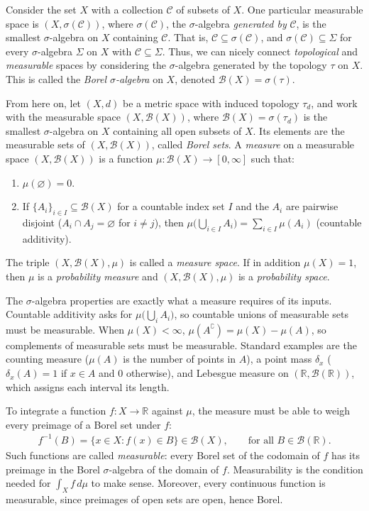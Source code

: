 \documentclass[12pt]{article}
\theoremstyle{remark}
\begin{document}
Consider the set $X$ with a collection $\mathcal{C}$ of subsets of $X$. One particular 
measurable space is $(X,\sigma(\mathcal{C}))$, where $\sigma(\mathcal{C})$, the $\sigma$-algebra 
\emph{generated by} $\mathcal{C}$, is the smallest $\sigma$-algebra on $X$ containing $\mathcal{C}$. 
That is, $\mathcal{C}\subseteq\sigma(\mathcal{C})$, and $\sigma(\mathcal{C})\subseteq\Sigma$ 
for every $\sigma$-algebra $\Sigma$ on $X$ with $\mathcal{C}\subseteq\Sigma$. Thus, we can 
nicely connect \emph{topological} and \emph{measurable} spaces by considering the 
$\sigma$-algebra generated by the topology $\tau$ on $X$. This is called the 
\emph{Borel $\sigma$-algebra} on $X$, denoted $\mathcal{B}(X)=\sigma(\tau)$.  

From here on, let $(X,d)$ be a metric space with induced topology $\tau_d$, and work with the 
measurable space $(X,\mathcal{B}(X))$, where $\mathcal{B}(X)=\sigma(\tau_d)$ is the smallest 
$\sigma$-algebra on $X$ containing all open subsets of $X$. Its elements are the measurable 
sets of $(X,\mathcal{B}(X))$, called \emph{Borel sets}. 
A \emph{measure} on a measurable space $(X,\mathcal{B}(X))$ is a function 
$\mu:\mathcal{B}(X)\to[0,\infty]$ such that:
\begin{enumerate}
    \item $\mu(\varnothing)=0$.
    \item If $\{A_i\}_{i\in I}\subseteq\mathcal{B}(X)$ for a countable index set $I$ and the $A_i$ are pairwise 
        disjoint ($A_i\cap A_j=\varnothing$ for $i\neq j$), then 
        $\mu\bigl(\bigcup_{i\in I}A_i\bigr)=\sum_{i\in I}\mu(A_i)$ (countable additivity).
\end{enumerate}
The triple $(X,\mathcal{B}(X),\mu)$ is called a \emph{measure space}. If in addition $\mu(X)=1$, then $\mu$ is 
a \emph{probability measure} and $(X,\mathcal{B}(X),\mu)$ is a \emph{probability space}.

The $\sigma$-algebra properties are exactly what a measure requires of its inputs. Countable additivity 
asks for $\mu\bigl(\bigcup_i A_i\bigr)$, so countable unions of measurable sets must be measurable. 
When $\mu(X)<\infty$, $\mu(A^\complement)=\mu(X)-\mu(A)$, so complements of measurable sets must be 
measurable. Standard examples are the counting measure ($\mu(A)$ is the number of points in $A$), 
a point mass $\delta_x$ ($\delta_x(A)=1$ if $x\in A$ and $0$ otherwise), and Lebesgue measure on 
$(\mathbb{R},\mathcal{B}(\mathbb{R}))$, which assigns each interval its length.

To integrate a function $f:X\to\mathbb{R}$ against $\mu$, the measure must be able to weigh every 
preimage of a Borel set under $f$:
\begin{align*}
    f^{-1}(B)=\{x\in X: f(x)\in B\}\in\mathcal{B}(X), 
        \qquad \text{for all } B\in\mathcal{B}(\mathbb{R}).
\end{align*}
Such functions are called \emph{measurable}: every Borel set of the codomain of $f$ has its preimage 
in the Borel $\sigma$-algebra of the domain of $f$. Measurability is the condition needed for 
$\int_X f\,d\mu$ to make sense. 
Moreover, every continuous function is measurable, since preimages of open sets are 
open, hence Borel.
\end{document}
